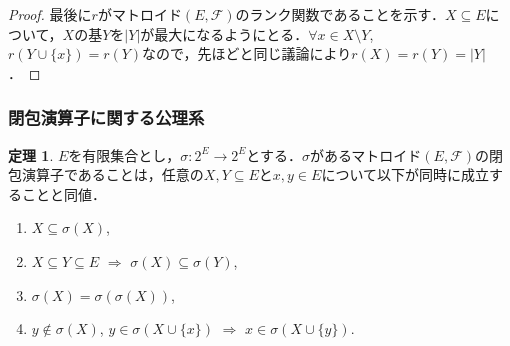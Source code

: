 \documentclass[xelatex,ja=standard,a4paper,14pt,everyparhook=compat]{bxjsarticle}
\theoremstyle{definition}
\newtheorem{theorem}{定理}[subsection]
\begin{document}
\begin{proof}
    \newpage

    最後に$r$がマトロイド$(E, \mathcal{F})$のランク関数であることを示す．$X \subseteq E$について，$X$の基$Y$を$|Y|$が最大になるようにとる．$\forall x \in X \setminus Y$, $r(Y \cup \{x\}) = r(Y)$なので，先ほどと同じ議論により$r(X) = r(Y) = |Y|$．
\end{proof}

\subsubsection*{閉包演算子に関する公理系}

\begin{theorem}
    $E$を有限集合とし，$\sigma : 2^E \to 2^E$とする．$\sigma$があるマトロイド$(E, \mathcal{F})$の閉包演算子であることは，任意の$X, Y \subseteq E$と$x, y \in E$について以下が同時に成立することと同値． \begin{enumerate}[label=(S\arabic*)]
        \item $X \subseteq \sigma(X)$,
        \item $X \subseteq Y \subseteq E$ $\Longrightarrow$ $\sigma(X) \subseteq \sigma(Y)$,
        \item $\sigma(X) = \sigma(\sigma(X))$,
        \item $y \notin \sigma(X)$, $y \in \sigma(X \cup \{x\})$ $\Longrightarrow$ $x \in \sigma(X \cup \{y\})$.
    \end{enumerate}
\end{theorem}
\end{document}
